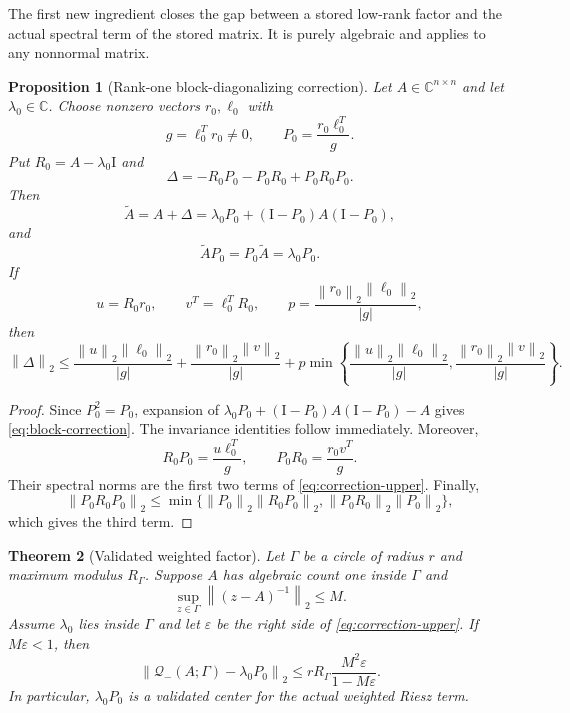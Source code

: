 \documentclass[11pt]{article}
\newtheorem{theorem}{Theorem}[section]
\newtheorem{proposition}[theorem]{Proposition}
\theoremstyle{definition}
\theoremstyle{remark}
\newcommand{\C}{\mathbb C}
\newcommand{\Id}{\mathrm I}
\newcommand{\cQ}{\mathcal Q}
\newcommand{\norm}[1]{\left\lVert #1\right\rVert}
\begin{document}
The first new ingredient closes the gap between a stored low-rank factor and
the actual spectral term of the stored matrix.  It is purely algebraic and
applies to any nonnormal matrix.

\begin{proposition}[Rank-one block-diagonalizing correction]
\label{prop:factor-correction}
Let $A\in\C^{n\times n}$ and let $\lambda_0\in\C$.  Choose nonzero vectors
$r_0,\ell_0$ with
\[
 g=\ell_0^Tr_0\ne0,
 \qquad
 P_0=\frac{r_0\ell_0^T}{g}.
\]
Put $R_0=A-\lambda_0\Id$ and
\begin{equation}
 \Delta=-R_0P_0-P_0R_0+P_0R_0P_0.
 \label{eq:block-correction}
\end{equation}
Then
\begin{equation}
 \widetilde A=A+\Delta
 =\lambda_0P_0+(\Id-P_0)A(\Id-P_0),
 \label{eq:corrected-matrix}
\end{equation}
and
\[
 \widetilde AP_0=P_0\widetilde A=\lambda_0P_0.
\]
If
\[
 u=R_0r_0,
 \qquad
 v^T=\ell_0^TR_0,
 \qquad
 p=\frac{\norm{r_0}_2\norm{\ell_0}_2}{|g|},
\]
then
\begin{equation}
 \norm\Delta_2
 \le
 \frac{\norm u_2\norm{\ell_0}_2}{|g|}
 +\frac{\norm{r_0}_2\norm v_2}{|g|}
 +p\min\!\left\{
 \frac{\norm u_2\norm{\ell_0}_2}{|g|},
 \frac{\norm{r_0}_2\norm v_2}{|g|}
 \right\}.
 \label{eq:correction-upper}
\end{equation}
\end{proposition}

\begin{proof}
Since $P_0^2=P_0$, expansion of
$\lambda_0P_0+(\Id-P_0)A(\Id-P_0)-A$ gives
\eqref{eq:block-correction}.  The invariance identities follow immediately.
Moreover,
\[
 R_0P_0=\frac{u\ell_0^T}{g},
 \qquad
 P_0R_0=\frac{r_0v^T}{g}.
\]
Their spectral norms are the first two terms of
\eqref{eq:correction-upper}.  Finally,
\[
 \norm{P_0R_0P_0}_2
 \le\min\{\norm{P_0}_2\norm{R_0P_0}_2,
           \norm{P_0R_0}_2\norm{P_0}_2\},
\]
which gives the third term.
\end{proof}

\begin{theorem}[Validated weighted factor]
\label{thm:validated-factor}
Let $\Gamma$ be a circle of radius $r$ and maximum modulus $R_\Gamma$.
Suppose $A$ has algebraic count one inside $\Gamma$ and
\[
 \sup_{z\in\Gamma}\norm{(z-A)^{-1}}_2\le M.
\]
Assume $\lambda_0$ lies inside $\Gamma$ and let $\varepsilon$ be the right
side of \eqref{eq:correction-upper}.  If $M\varepsilon<1$, then
\begin{equation}
 \norm{\cQ_-(A;\Gamma)-\lambda_0P_0}_2
 \le
 rR_\Gamma
 \frac{M^2\varepsilon}{1-M\varepsilon}.
 \label{eq:weighted-factor-bound}
\end{equation}
In particular, $\lambda_0P_0$ is a validated center for the actual weighted
Riesz term.
\end{theorem}
\end{document}
